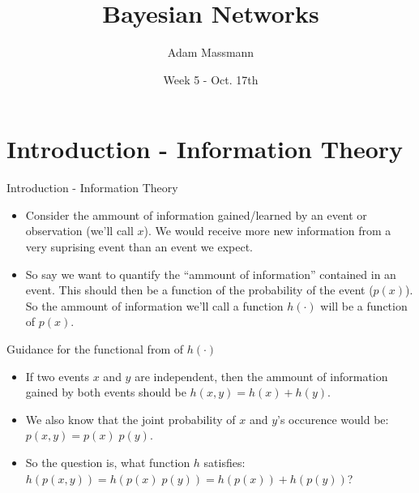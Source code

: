 \documentclass{beamer}
\title[Your Short Title]{Bayesian Networks}
\author{Adam Massmann}
\institute{Water Center NN Meetings}
\date{Week 5 - Oct. 17th}
\begin{document}
\begin{frame}
  \titlepage
\end{frame}


\section{Introduction - Information Theory}

\begin{frame}{Introduction - Information Theory}
\begin{itemize}
\item Consider the ammount of information gained/learned by an event or observation (we'll call $x$). We would receive more new information from a very suprising event than an event we expect.
\item So say we want to quantify the ``ammount of information'' contained in an event. This should then be a function of the probability of the event ($p(x)$). So the ammount of information we'll call a function $h(\cdot )$ will be a function of $p(x)$.
\end{itemize}

\end{frame}


\begin{frame}{Guidance for the functional from of $h(\cdot ) $}
\begin{itemize}
\item If two events $x$ and $y$ are independent, then the ammount of information gained by both events should be $h(x,y) = h(x) + h(y)$.
\item We also know that the joint probability of $x$ and $y$'s occurence would be: $p(x,y) = p(x) \; p(y)$.
  \item So the question is, what function $h$ satisfies: $h(p(x,y)) = h(p(x)\; p(y)) = h(p(x)) + h(p(y))$?
\end{itemize}

\end{frame}
\end{document}
